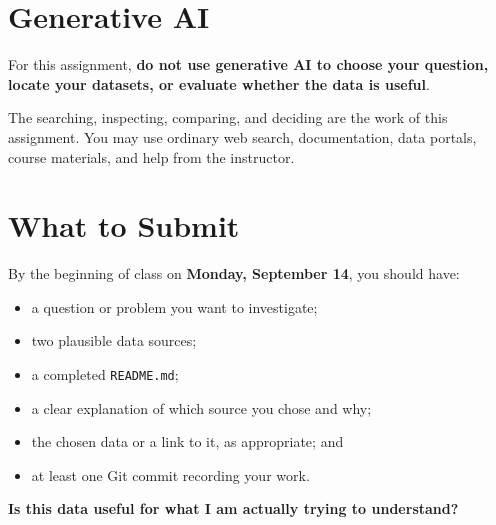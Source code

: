 \documentclass[11pt]{article}
\begin{document}
\section{Generative AI}

For this assignment, \textbf{do not use generative AI to choose your
question, locate your datasets, or evaluate whether the data is useful}.

The searching, inspecting, comparing, and deciding are the work of this
assignment. You may use ordinary web search, documentation, data portals,
course materials, and help from the instructor.

\section{What to Submit}

By the beginning of class on \textbf{Monday, September 14}, you should have:

\begin{itemize}[leftmargin=*]
  \item a question or problem you want to investigate;
  \item two plausible data sources;
  \item a completed \texttt{README.md};
  \item a clear explanation of which source you chose and why;
  \item the chosen data or a link to it, as appropriate; and
  \item at least one Git commit recording your work.
\end{itemize}

\begin{reflection}
\begin{center}
\large
\textbf{Is this data useful for what I am actually trying to understand?}
\end{center}
\end{reflection}
\end{document}
